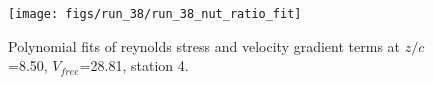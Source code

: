 \begin{figure}[H]
\centering
\texttt{[image: figs/run\_38/run\_38\_nut\_ratio\_fit]}
\caption{Polynomial fits of reynolds stress and velocity gradient terms at $z/c$=8.50, $V_{free}$=28.81, station 4.}
\label{fig:run_38_nut_ratio_fit}
\end{figure}


